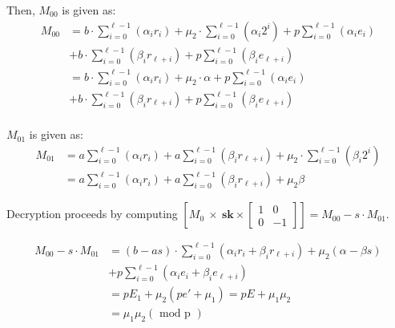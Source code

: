\documentclass[10pt,journal,compsoc]{IEEEtran}
\theoremstyle{definition}
\begin{document}
 

Then, $M_{00}$ is given as:
 \begin{align*}
   M_{00} &= b\cdot\sum_{i=0}^{\ell-1}\left(\alpha_ir_i\right)+ \mu_2\cdot\sum_{i=0}^{\ell-1}\left(\alpha_i2^i\right)+p\sum_{i=0}^{\ell-1}\left(\alpha_ie_i\right)\\ 
   &+b\cdot\sum_{i=0}^{\ell-1}\left(\beta_ir_{\ell+i}\right)+p\sum_{i=0}^{\ell-1}\left(\beta_ie_{\ell+i}\right)
   \\
   &= b\cdot\sum_{i=0}^{\ell-1}\left(\alpha_ir_i\right)+ \mu_2\cdot\alpha+p\sum_{i=0}^{\ell-1}\left(\alpha_ie_i\right)\\ 
   &+b\cdot\sum_{i=0}^{\ell-1}\left(\beta_ir_{\ell+i}\right)+p\sum_{i=0}^{\ell-1}\left(\beta_ie_{\ell+i}\right)\\
  \end{align*}
  
  $M_{01}$ is given as:
 \begin{align*}
   M_{01} & = a\sum_{i=0}^{\ell-1}\left(\alpha_ir_i \right) + a\sum_{i=0}^{\ell-1}\left(\beta_ir_{\ell+i} \right) + \mu_2\cdot\sum_{i=0}^{\ell-1}\left(\beta_i2^i \right)
   \\
   &=  a\sum_{i=0}^{\ell-1}\left(\alpha_ir_i \right) + a\sum_{i=0}^{\ell-1}\left(\beta_ir_{\ell+i} \right) + \mu_2\beta
  \end{align*}

Decryption proceeds by computing $\left[M_{0} \ \times \ \textbf{sk} \times
\left[ 
\begin{smallmatrix} 
1 & 0\\
0 & -1  
\end{smallmatrix}
\right]
\right] = M_{00}-s\cdot M_{01}.
$

\begin{align*}
  M_{00}-s\cdot M_{01} &= \left(b-as\right)\cdot\sum_{i=0}^{\ell-1}\left( \alpha_ir_i+\beta_ir_{\ell+i}\right)+\mu_2\left(\alpha-\beta s\right)\\
  &+ p\sum_{i=0}^{\ell-1}\left(\alpha_ie_i + \beta_ie_{\ell+i} \right)\\
  &=pE_1 + \mu_2\left(pe'+\mu_1\right) = pE + \mu_1\mu_2\\
  &= \mu_1\mu_2 \left( \text{ mod p }\right)
 \end{align*}
\end{document}
